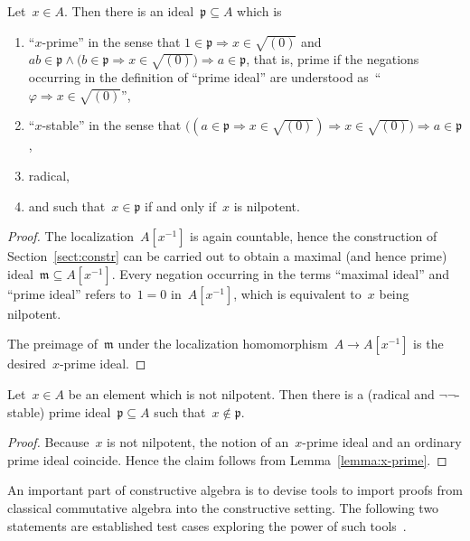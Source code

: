 \documentclass[envcountsect,envcountsame,runningheads]{llncs}
\newcommand{\mmm}{\mathfrak{m}}
\newcommand{\ppp}{\mathfrak{p}}
\renewcommand{\_}{\mathpunct{.}\,}
\begin{document}
\begin{lemma}\label{lemma:x-prime}
Let~$x \in A$. Then there is an ideal~$\ppp \subseteq A$ which is
\begin{enumerate}
\item ``$x$-prime'' in the sense that
$1 \in \ppp \Rightarrow x \in \sqrt{(0)}$ and
$ab \in \ppp \wedge \bigl(b \in \ppp \Rightarrow x \in \sqrt{(0)}\bigr) \Longrightarrow
   a \in \ppp$,
that is, prime if the negations occurring in the definition of ``prime ideal''
are understood as~``$\varphi \Rightarrow x \in \sqrt{(0)}$'',
\item ``$x$-stable'' in the sense that
$\bigl((a \in \ppp \Rightarrow x \in \sqrt{(0)}) \Rightarrow x \in \sqrt{(0)}\bigr)
  \Rightarrow a \in \ppp$,
\item radical,
\item and such that~$x \in \ppp$ if and only if~$x$ is nilpotent.
\end{enumerate}
\end{lemma}

\begin{proof}The localization~$A[x^{-1}]$ is again countable, hence the
construction of Section~\ref{sect:constr} can be carried out to obtain a
maximal (and hence prime) ideal~$\mmm \subseteq A[x^{-1}]$. Every negation
occurring in the terms ``maximal ideal'' and ``prime ideal'' refers to~$1 = 0$
in~$A[x^{-1}]$, which is equivalent to~$x$ being nilpotent.

The preimage of~$\mmm$ under the localization homomorphism~$A \to A[x^{-1}]$ is
the desired~$x$-prime ideal.
\end{proof}

\begin{corollary}\label{prop:nilp-prime}Let~$x \in A$ be an element which is not nilpotent. Then there is a
(radical and $\neg\neg$-stable) prime ideal~$\ppp \subseteq A$ such that~$x \not\in \ppp$.
\end{corollary}

\begin{proof}Because~$x$ is not nilpotent, the notion of an~$x$-prime ideal and
an ordinary prime ideal coincide. Hence the claim follows from
Lemma~\ref{lemma:x-prime}.\end{proof}

An important part of constructive algebra is to devise tools to import
proofs from classical commutative algebra into the constructive setting.
The following two statements are established test cases exploring the power of
such tools~\cite{schuster:induction,persson:constructive-spectrum,banaschweski-vermeulen:radical,coquand-lombardi:logical,coquand-lombardi-roy:dynamicalmethod}.
\end{document}
